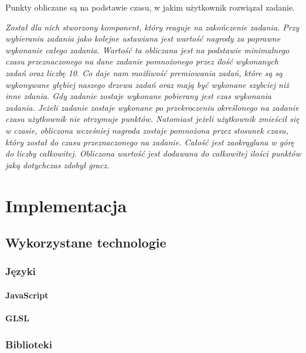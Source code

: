 \documentclass[11pt,a4paper,polish,thesis]{dcsbook}
\begin{document}
	Punkty obliczane są na podstawie czasu, w jakim użytkownik rozwiązał zadanie. 
	
	
	\textit{	Został dla nich stworzony komponent, który reaguje na zakończenie zadania. Przy wybieraniu zadania jako kolejne ustawiana jest wartość nagrody za poprawne wykonanie całego zadania. Wartość ta obliczana jest na podstawie minimalnego czasu przeznaczonego na dane zadanie pomnożonego przez ilość wykonanych zadań oraz liczbę 10. Co daje nam możliwość premiowania zadań, które są są wykonywane głębiej naszego drzewa zadań oraz mają być wykonane szybciej niż inne zdania. Gdy zadanie zostaje wykonane pobierany jest czas wykonania zadania. Jeżeli zadanie zostaje wykonane po przekroczeniu określonego na zadanie czasu użytkownik nie otrzymuje punktów. Natomiast jeżeli użytkownik zmieścił się w czasie, obliczona wcześniej nagroda zostaje pomnożona przez stosunek czasu, który został do czasu przeznaczonego na zadanie. Całość jest zaokrąglana w górę do liczby całkowitej. Obliczona wartość jest dodawana do całkowitej ilości punktów jaką dotychczas zdobył gracz. }
	
	\chapter{Implementacja}
	
	\section{Wykorzystane technologie}
	
	\subsection{Języki}
	
	\subsubsection{JavaScript}
	
	\subsubsection{GLSL}
	
	\subsection{Biblioteki}
	
\end{document}
